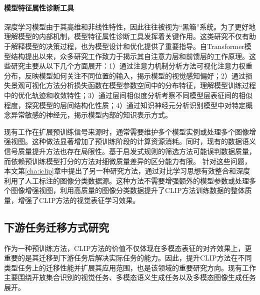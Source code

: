\paragraph{模型特征属性诊断工具} 深度学习模型由于其高维和非线性特性，因此往往被视为“黑箱”系统。为了更好地理解模型的内部机制，模型特征属性诊断工具发挥着关键作用\cite{yosinski2014transferable}。这类研究不仅有助于解释模型的决策过程，也为模型设计和优化提供了重要指导。自Transformer模型结构提出以来，众多研究工作\cite{zhou2021deepvit, dosovitskiy2020vit, goh2021multimodal, dai-etal-2022-knowledge, imagnettransfer, raghu2021vision}致力于揭示其自注意力层和前馈层的工作原理。这些研究主要从以下几个方面展开：1）通过注意力机制分析方法\cite{zhou2021deepvit, dosovitskiy2020vit}可视化注意力权重分布，反映模型如何关注不同位置的输入，揭示模型的视觉感知偏好；2）通过损失景观可视化方法\cite{li2018visualizing}分析损失函数在模型参数空间中的分布特征，理解模型训练过程中的优化轨迹和收敛特性；3）通过层间相似度分析\cite{kornblith2019similarity}考察不同模型层表征间的相似程度，探究模型的层间结构化性质；4）通过知识神经元分析\cite{dai-etal-2022-knowledge, goh2021multimodal}识别模型中对特定概念异常敏感的神经元，揭示模型内部的知识表示方式。

现有工作在扩展预训练信号来源时，通常需要维护多个模型实例\cite{TCL,MaskCLIP}或处理多个图像增强视图\cite{SLIP,TCL,li2022supervision}。这种做法显著增加了预训练阶段的计算资源消耗。同时，现有的数据语义信号质量提升方法也存在局限性。基于启发式规则的筛选方法\cite{sharma-etal-2018-conceptual}可能误判数据质量，而依赖预训练模型打分的方法\cite{schuhmann2021laion400m}对细微质量差异的区分能力有限。
针对这些问题，本文第\ref{cha:iclip}章中提出了另一种研究方法，通过对比学习思想有效整合和深度利用了人工标注的图像分类数据源。这种方法不需要增强额外的模型参数或处理多个图像增强视图，利用高质量的图像分类数据提升了CLIP方法训练数据的整体质量，增强了CLIP方法的视觉表征学习效果。

\subsection{下游任务迁移方式研究}
作为一种预训练方法，CLIP方法的价值不仅体现在多模态表征的对齐效果上，更重要的是其迁移到下游任务后解决实际任务的能力。因此，提升CLIP方法在不同类型任务上的迁移性能并扩展其应用范围，也是该领域的重要研究方向。现有工作主要围绕开放集合识别的视觉任务、多模态语义生成任务以及多模态图像生成任务展开。

